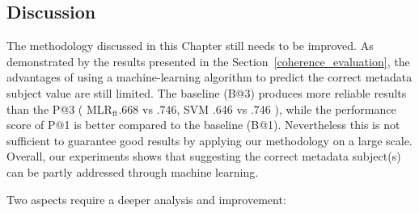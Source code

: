 \documentclass[epsfig,a4paper,12pt,titlepage]{book}
\newcommand{\mlr}{MLR$_\text{ft}$\xspace}
\begin{document}
\begin{table}[h]
\caption{Sample of wrong prediction outcome between the subject  ``Religion and Magic'' and  ``Bible''}
\label{tab:example_unpred_res}       %
\setlength{\tabcolsep}{3pt}
\centering
{}
\end{table}
\color{black}


\subsection{Discussion}
The methodology discussed in this Chapter still needs to be improved. As demonstrated by the results presented in the Section~\ref{coherence_evaluation}, the advantages of using a machine-learning algorithm to predict the correct metadata subject value are still limited. The baseline (B@3) produces more reliable results than the P@3 ( \mlr .668 vs .746, SVM .646 vs .746 ), while the performance score of P@1 is better compared to the baseline (B@1). Nevertheless this is not sufficient to guarantee good results by applying our methodology on a large scale.
Overall, our experiments shows that suggesting the correct metadata subject(s) can be partly addressed through machine learning.    

Two aspects require a deeper analysis and improvement:
\end{document}
